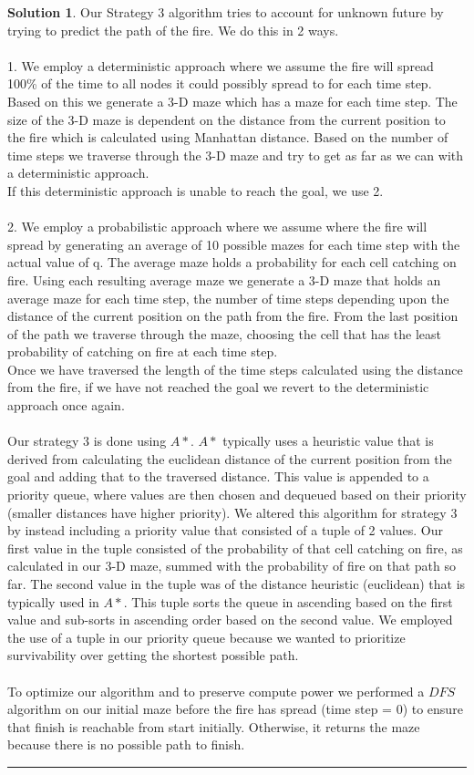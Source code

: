 \documentclass{article}
\theoremstyle{definition}
\def\fline{\rule{0.75\linewidth}{0.5pt}}
\newcommand{\finishline}{\vspace{-15pt}\begin{center}\fline\end{center}}
\newtheorem*{solution*}{Solution}
\newenvironment{solution}{\begin{solution*}}{{\finishline} \end{solution*}}
\begin{document}
\begin{solution}
	Our Strategy 3 algorithm tries to account for unknown future by trying to predict the path of the fire. We do this in 2 ways. 
    \\\\
	1. We employ a deterministic approach where we assume the fire will spread 100\% of the time to all nodes it could possibly spread to for each time step. Based on this we generate a 3-D maze which has a maze for each time step. The size of the 3-D maze is dependent on the distance from the current position to the fire which is calculated using Manhattan distance. Based on the number of time steps we traverse through the 3-D maze and try to get as far as we can with a deterministic approach. 
	\\
	If this deterministic approach is unable to reach the goal, we use 2. 
	\\\\
	2. We employ a probabilistic approach where we assume where the fire will spread by generating an average of 10 possible mazes for each time step with the actual value of q. The average maze holds a probability for each cell catching on fire. Using each resulting average maze we generate a 3-D maze that holds an average maze for each time step, the number of time steps depending upon the distance of the current position on the path from the fire. From the last position of the path we traverse through the maze, choosing the cell that has the least probability of catching on fire at each time step.
	\\ 
	Once we have traversed the length of the time steps calculated using the distance from the fire, if we have not reached the goal we revert to the deterministic approach once again.
	\\\\
	Our strategy 3 is done using $A*$. $A*$ typically uses a heuristic value that is derived from calculating the euclidean distance of the current position from the goal and adding that to the traversed distance. This value is appended to a priority queue, where values are then chosen and dequeued based on their priority (smaller distances have higher priority). We altered this algorithm for strategy 3 by instead including a priority value that consisted of a tuple of 2 values. Our first value in the tuple consisted of the probability of that cell catching on fire, as calculated in our 3-D maze, summed with the probability of fire on that path so far. The second value in the tuple was of the distance heuristic (euclidean) that is typically used in $A*$. This tuple sorts the queue in ascending based on the first value and sub-sorts in ascending order based on the second value. We employed the use of a tuple in our priority queue because we wanted to prioritize survivability over getting the shortest possible path. 
	\\\\
	To optimize our algorithm and to preserve compute power we performed a $DFS$ algorithm on our initial maze before the fire has spread (time step = 0) to ensure that finish is reachable from start initially. Otherwise, it returns the maze because there is no possible path to finish.
	

\end{solution}
\end{document}
